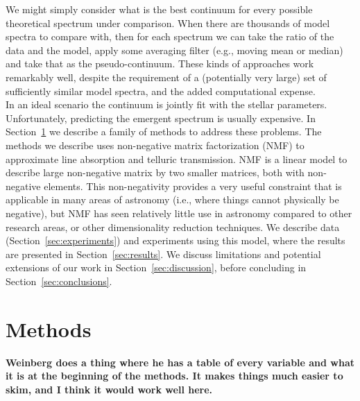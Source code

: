 \documentclass[modern]{aastex631}
\newcommand{\ajw}[1]{\textbf{#1}}
\begin{document}
We might simply consider what is the best continuum for every possible theoretical spectrum under comparison. When there are thousands of model spectra to compare with, then for each spectrum we can take the ratio of the data and the model, apply some averaging filter (e.g., moving mean or median) and take that as the pseudo-continuum. These kinds of approaches work remarkably well, despite the requirement of a (potentially very large) set of sufficiently similar model spectra, and the added computational expense.\\


In an ideal scenario the continuum is jointly fit with the stellar parameters. Unfortunately, predicting the emergent spectrum is usually expensive. In Section~\ref{sec:methods} we describe a family of methods to address these problems.
The methods we describe uses non-negative matrix factorization (NMF) to approximate line absorption and telluric transmission. NMF is a linear model to describe large non-negative matrix by two smaller matrices, both with non-negative elements. This non-negativity provides a very useful constraint that is applicable in many areas of astronomy (i.e., where things cannot physically be negative), but NMF has seen relatively little use in astronomy compared to other research areas, or other dimensionality reduction techniques. 
We describe data (Section~\ref{sec:experiments}) and experiments using this model, where the results are presented in Section~\ref{sec:results}. We discuss limitations and potential extensions of our work in Section~\ref{sec:discussion}, before concluding in Section~\ref{sec:conclusions}.\\



\section{Methods}\label{sec:methods}
\ajw{Weinberg does a thing where he has a table of every variable and what it is at the beginning of the methods.  It makes things much easier to skim, and I think it would work well here.}
\end{document}
